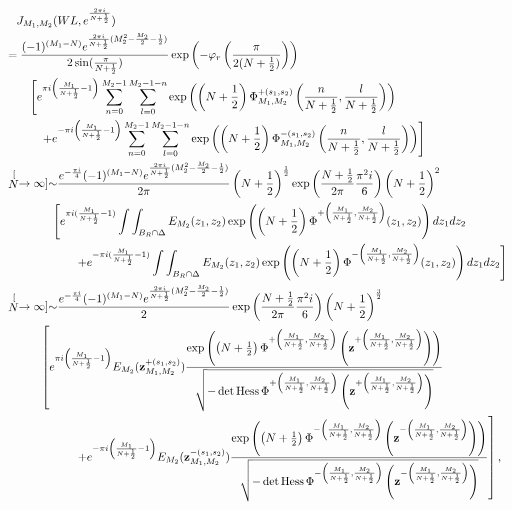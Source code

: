 \documentclass[10pt,a4paper]{article}
\newcommand{\lt}{\left}
\newcommand{\rt}{\right}
\def \det{\operatorname{det}}
\def \Hess{\operatorname{Hess}}
\begin{document}
\begin{align}
&\quad J_{M_1, M_2} (WL, e^{\frac{2\pi i}{N+\frac{1}{2}}}) \notag  \\
&= \frac{ (-1)^{(M_1 - N) }  e^{\frac{2\pi i}{N+\frac{1}{2}}(M_2^2 - \frac{M_2}{2} - \frac{1}{2})}}{2\sin(\frac{\pi}{N+\frac{1}{2}})} \exp\lt(  -\varphi_r\lt(  \frac{\pi}{2(N+\frac{1}{2})}\rt)\rt)\notag \\
&\qquad  \lt[e^{\pi i \lt(\frac{M_1}{N+\frac{1}{2}} - 1\rt) }\sum_{n=0}^{M_2-1} \sum_{l=0}^{M_2-1-n} \exp\lt( \lt(N+\frac{1}{2}\rt)\Phi^{+(s_1,s_2)}_{M_1,M_2} \lt(\frac{n}{N+\frac{1}{2}},\frac{l}{N+\frac{1}{2}}\rt) \rt) \rt. \notag \\
&\qquad \quad \lt. + e^{-\pi i \lt(\frac{M_1}{N+\frac{1}{2}} - 1\rt) }\sum_{n=0}^{M_2-1} \sum_{l=0}^{M_2-1-n} \exp\lt( \lt(N+\frac{1}{2}\rt)\Phi^{-(s_1,s_2)}_{M_1,M_2} \lt(\frac{n}{N+\frac{1}{2}},\frac{l}{N+\frac{1}{2}}\rt) \rt) \rt] \notag \\
&\stackrel[N \to \infty]{\sim}{}  \frac{ e^{-\frac{\pi i}{4}} (-1)^{(M_1 - N) }  e^{\frac{2\pi i}{N+\frac{1}{2}}(M_2^2 - \frac{M_2}{2} - \frac{1}{2})}}{2\pi} \lt(N+\frac{1}{2}\rt)^{\frac{1}{2}}\exp\lt( \frac{N+\frac{1}{2}}{2\pi } \frac{\pi^2 i}{6} \rt)\lt(N+\frac{1}{2}\rt)^2   \notag  \\
& \qquad\qquad\lt[ e^{\pi i (\frac{M_1}{N+\frac{1}{2}} -1)} \int\int_{B_R \cap \Delta}  E_{M_2}(z_1,z_2)\exp \lt( \lt(N+\frac{1}{2}\rt) \Phi^{+\lt(\frac{M_1}{N+\frac{1}{2}}, \frac{M_2}{N+\frac{1}{2}}\rt)} (z_1, z_2) \rt) dz_1 dz_2 \rt. \notag  \\
& \qquad\qquad\qquad \lt.  + e^{-\pi i (\frac{M_1}{N+\frac{1}{2}} -1)} \int\int_{B_R \cap \Delta}  E_{M_2}(z_1,z_2)\exp \lt( \lt(N+\frac{1}{2}\rt) \Phi^{-\lt(\frac{M_1}{N+\frac{1}{2}}, \frac{M_2}{N+\frac{1}{2}}\rt)} (z_1, z_2) \rt) dz_1 dz_2 \rt] \notag  \\
&\stackrel[N \to \infty]{\sim}{}  \frac{e^{-\frac{\pi i}{4}} (-1)^{(M_1 - N) }  e^{\frac{2\pi i}{N+\frac{1}{2}}(M_2^2 - \frac{M_2}{2} - \frac{1}{2})}}{2} \exp\lt( \frac{N+\frac{1}{2}}{2\pi } \frac{\pi^2 i}{6} \rt) \lt(N+\frac{1}{2}\rt)^\frac{3}{2}   \notag  \\
& \qquad\quad\lt[ e^{\pi i \lt(\frac{M_1}{N+\frac{1}{2}} -1\rt)}E_{M_2}(\mathbf{z}^{+(s_1,s_2)}_{M_1,M_2} ) \frac{ \exp\lt( \lt(N+\frac{1}{2}\rt) \Phi^{+\lt(\frac{M_1}{N+\frac{1}{2}}, \frac{M_2}{N+\frac{1}{2}}\rt)} \lt(\mathbf{z}^{+\lt(\frac{M_1}{N+\frac{1}{2}}, \frac{M_2}{N+\frac{1}{2}}\rt)} \rt) \rt)}{ \sqrt{-\det\Hess \Phi^{+\lt(\frac{M_1}{N+\frac{1}{2}}, \frac{M_2}{N+\frac{1}{2}}\rt)} \lt(\mathbf{z}^{+\lt(\frac{M_1}{N+\frac{1}{2}}, \frac{M_2}{N+\frac{1}{2}}\rt)}\rt)}}  \rt. \notag\\
&\qquad\qquad\qquad \lt.  + e^{-\pi i \lt(\frac{M_1}{N+\frac{1}{2}} -1\rt)}E_{M_2}(\mathbf{z}^{-(s_1,s_2)}_{M_1,M_2} )  \frac{ \exp\lt( \lt(N+\frac{1}{2}\rt) \Phi^{-\lt(\frac{M_1}{N+\frac{1}{2}}, \frac{M_2}{N+\frac{1}{2}}\rt)} \lt(\mathbf{z}^{-\lt(\frac{M_1}{N+\frac{1}{2}}, \frac{M_2}{N+\frac{1}{2}}\rt)} \rt) \rt)}{ \sqrt{-\det\Hess \Phi^{-\lt(\frac{M_1}{N+\frac{1}{2}}, \frac{M_2}{N+\frac{1}{2}}\rt)} \lt(\mathbf{z}^{-\lt(\frac{M_1}{N+\frac{1}{2}}, \frac{M_2}{N+\frac{1}{2}}\rt)} \rt)}}  \rt] ,
\end{align}
\end{document}
